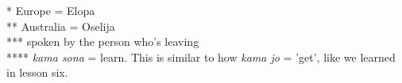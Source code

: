 * Europe = Elopa \\
** Australia = Oselija \\
*** spoken by the person who's leaving \\
****  \textit{kama sona} = learn. This is similar to how \textit{kama jo} = 'get', like we learned in lesson six. \\
